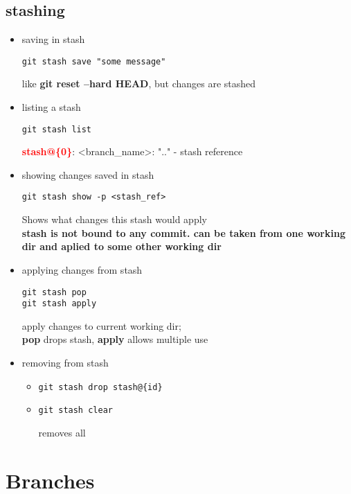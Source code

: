 \documentclass{report}
\begin{document}
\section{stashing}
\begin{itemize}
\item saving in stash
\begin{verbatim}
git stash save "some message"
\end{verbatim}
like \textbf{git reset --hard HEAD}, but changes are stashed

\item listing a stash 
\begin{verbatim}
git stash list
\end{verbatim}
\textcolor{red}{\textbf{stash@\{0\}}}: \textless branch\_name\textgreater: ".." - stash reference

\item showing changes saved in stash
\begin{verbatim}
git stash show -p <stash_ref>
\end{verbatim}
Shows what changes this stash would apply\\
\textbf{stash is not bound to any commit. can be taken from one working dir and aplied to some other working dir}

\item applying changes from stash
\begin{verbatim}
git stash pop
git stash apply
\end{verbatim}
apply changes to current working dir;\\
\textbf{pop} drops stash, \textbf{apply} allows multiple use

\item removing from stash
\begin{itemize}
\item \begin{verbatim}
git stash drop stash@{id}
\end{verbatim}

\item \begin{verbatim}
git stash clear
\end{verbatim}
removes all

\end{itemize}
\end{itemize}

\chapter{Branches}
\end{document}

